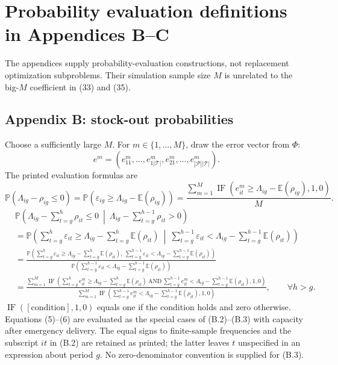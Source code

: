\documentclass[10pt]{article}
\begin{document}
\section*{Probability evaluation definitions in Appendices B--C}
The appendices supply probability-evaluation constructions, not replacement optimization subproblems. Their simulation sample size $M$ is unrelated to the big-$M$ coefficient in (33) and (35).

\subsection*{Appendix B: stock-out probabilities}
Choose a sufficiently large $M$. For $m\in\{1,\ldots,M\}$, draw the error vector from $\Phi$:
\begin{equation}
 e^m=(e^m_{11},\ldots,e^m_{1|\mathcal T|},e^m_{21},\ldots,e^m_{|\mathcal P||\mathcal T|}).
\tag{B.1}
\end{equation}
The printed evaluation formulas are
\begin{equation}
\mathbb P(\Lambda_{ig}-\rho_{ig}\leqslant0)
=\mathbb P(\varepsilon_{ig}\geqslant\Lambda_{ig}-\mathbb E(\rho_{ig}))
=\frac{\sum_{m=1}^{M}\operatorname{IF}(e^m_{it}\geqslant\Lambda_{ig}-\mathbb E(\rho_{ig}),1,0)}{M}.
\tag{B.2}
\end{equation}
\begin{equation}
\begin{aligned}
&\mathbb P\left(\Lambda_{ig}-\sum_{t=g}^{h}\rho_{it}\leqslant0\ \middle|\ \Lambda_{ig}-\sum_{t=g}^{h-1}\rho_{it}>0\right)\\
&=\mathbb P\left(\sum_{t=g}^{h}\varepsilon_{it}\geqslant\Lambda_{ig}-\sum_{t=g}^{h}\mathbb E(\rho_{it})\ \middle|\ \sum_{t=g}^{h-1}\varepsilon_{it}<\Lambda_{ig}-\sum_{t=g}^{h-1}\mathbb E(\rho_{it})\right)\\
&=\frac{\mathbb P\left(\sum_{t=g}^{h}\varepsilon_{it}\geqslant\Lambda_{ig}-\sum_{t=g}^{h}\mathbb E(\rho_{it}),\ \sum_{t=g}^{h-1}\varepsilon_{it}<\Lambda_{ig}-\sum_{t=g}^{h-1}\mathbb E(\rho_{it})\right)}
{\mathbb P\left(\sum_{t=g}^{h-1}\varepsilon_{it}<\Lambda_{ig}-\sum_{t=g}^{h-1}\mathbb E(\rho_{it})\right)}\\
&=\frac{\displaystyle\sum_{m=1}^{M}\operatorname{IF}\left(\sum_{t=g}^{h}e^m_{it}\geqslant\Lambda_{ig}-\sum_{t=g}^{h}\mathbb E(\rho_{it})\ \mathrm{AND}\ \sum_{t=g}^{h-1}e^m_{it}<\Lambda_{ig}-\sum_{t=g}^{h-1}\mathbb E(\rho_{it}),1,0\right)}
{\displaystyle\sum_{m=1}^{M}\operatorname{IF}\left(\sum_{t=g}^{h-1}e^m_{it}<\Lambda_{ig}-\sum_{t=g}^{h-1}\mathbb E(\rho_{it}),1,0\right)},\qquad\forall h>g.
\end{aligned}\tag{B.3}
\end{equation}
$\operatorname{IF}([\text{condition}],1,0)$ equals one if the condition holds and zero otherwise. Equations (5)--(6) are evaluated as the special cases of (B.2)--(B.3) with capacity after emergency delivery. The equal signs to finite-sample frequencies and the subscript $it$ in (B.2) are retained as printed; the latter leaves $t$ unspecified in an expression about period $g$. No zero-denominator convention is supplied for (B.3).
\end{document}
